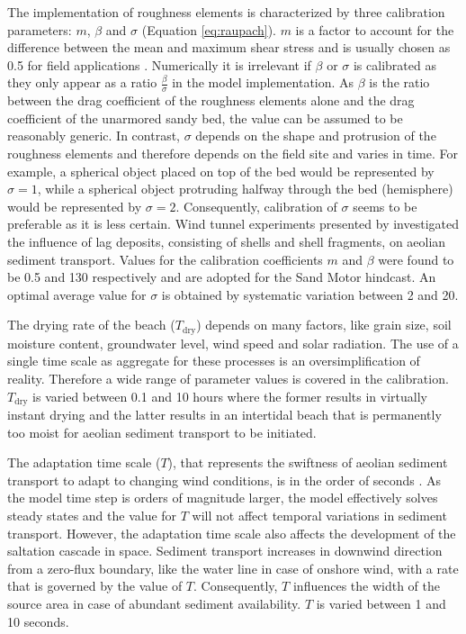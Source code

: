 \documentclass[preprint,12pt,authoryear]{elsarticle}
\begin{document}
The implementation of roughness elements is characterized by three
calibration parameters: $m$, $\beta$ and $\sigma$ (Equation
\ref{eq:raupach}). $m$ is a factor to account for the difference
between the mean and maximum shear stress and is usually chosen as 0.5
for field applications \citep{Raupach1993,
  McKennaNeuman2012}. Numerically it is irrelevant if $\beta$ or
$\sigma$ is calibrated as they only appear as a ratio
$\frac{\beta}{\sigma}$ in the model implementation. As $\beta$ is the
ratio between the drag coefficient of the roughness elements alone and
the drag coefficient of the unarmored sandy bed, the value can be
assumed to be reasonably generic. In contrast, $\sigma$ depends on the
shape and protrusion of the roughness elements and therefore depends
on the field site and varies in time. For example, a spherical object
placed on top of the bed would be represented by $\sigma = 1$, while a
spherical object protruding halfway through the bed (hemisphere) would
be represented by $\sigma = 2$. Consequently, calibration of $\sigma$
seems to be preferable as it is less certain. Wind tunnel experiments
presented by \citet{McKennaNeuman2012} investigated the influence of
lag deposits, consisting of shells and shell fragments, on aeolian
sediment transport. Values for the calibration coefficients $m$ and
$\beta$ were found to be 0.5 and 130 respectively and are adopted for
the Sand Motor hindcast. An optimal average value for $\sigma$ is
obtained by systematic variation between 2 and 20.

The drying rate of the beach ($T_{\mathrm{dry}}$) depends on many
factors, like grain size, soil moisture content, groundwater level,
wind speed and solar radiation. The use of a single time scale as
aggregate for these processes is an oversimplification of
reality. Therefore a wide range of parameter values is covered in the
calibration. $T_{\mathrm{dry}}$ is varied between 0.1 and 10 hours
where the former results in virtually instant drying and the latter
results in an intertidal beach that is permanently too moist for
aeolian sediment transport to be initiated.

The adaptation time scale ($T$), that represents the swiftness of
aeolian sediment transport to adapt to changing wind conditions, is in
the order of seconds \citep{DavidsonArnott2008, deVries2014a}. As the
model time step is orders of magnitude larger, the model effectively
solves steady states and the value for $T$ will not affect temporal
variations in sediment transport. However, the adaptation time scale
also affects the development of the saltation cascade in
space. Sediment transport increases in downwind direction from a
zero-flux boundary, like the water line in case of onshore wind, with
a rate that is governed by the value of $T$. Consequently, $T$
influences the width of the source area in case of abundant sediment
availability. $T$ is varied between 1 and 10 seconds.
\end{document}
